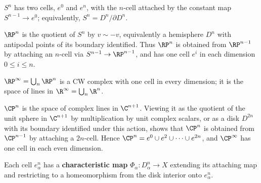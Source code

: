 \begin{example}
\label{ex:sphere-two-cells}

$S^n$ has two cells, $e^0$ and $e^n$, with the $n$-cell attached by the constant
map $S^{n-1}\to e^0$; equivalently, $S^n=D^n/\partial D^n$.
\end{example}

\begin{example}
\label{ex:real-projective-space-cw}

$\RP^n$ is the quotient of $S^n$ by $v\sim -v$, equivalently a hemisphere $D^n$
with antipodal points of its boundary identified. Thus $\RP^n$ is obtained from
$\RP^{n-1}$ by attaching an $n$-cell via $S^{n-1}\to\RP^{n-1}$, and has one cell
$e^i$ in each dimension $0\le i\le n$.
\end{example}

\begin{example}
\label{ex:infinite-real-projective-space}

$\RP^\infty=\bigcup_n\RP^n$ is a CW complex with one cell in every dimension;
it is the space of lines in $\R^\infty=\bigcup_n\R^n$.
\end{example}

\begin{example}
\label{ex:complex-projective-space-cw}

$\CP^n$ is the space of complex lines in $\C^{n+1}$. Viewing it as the quotient of
the unit sphere in $\C^{n+1}$ by multiplication by unit complex scalars, or as a disk
$D^{2n}$ with its boundary identified under this action, shows that $\CP^n$ is obtained
from $\CP^{n-1}$ by attaching a $2n$-cell. Hence
$\CP^n=e^0\cup e^2\cup\cdots\cup e^{2n}$, and $\CP^\infty$ has one cell in each
even dimension.
\end{example}

\begin{definition}
\label{def:characteristic-map}



Each cell $e^n_\alpha$ has a \textbf{characteristic map}
$\Phi_\alpha:D^n_\alpha\to X$ extending its attaching map and restricting to a
homeomorphism from the disk interior onto $e^n_\alpha$.
\end{definition}

